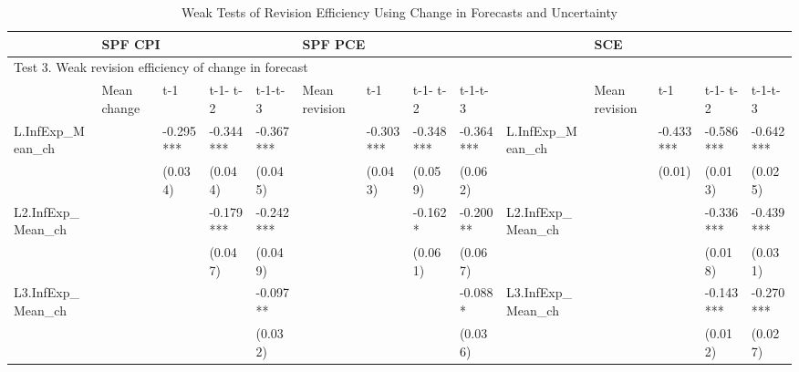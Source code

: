 \documentclass[12pt]{article}
\begin{document}
	
	\begin{table}
		\begin{adjustbox}{width={24cm},totalheight={14cm}}
			\begin{threeparttable}
				\caption{Weak Tests of Revision Efficiency Using Change in Forecasts and Uncertainty}
				\label{WeakRevEfficiency}
				\begin{tabular}{llllllllllllll}
					\hline 
					& \multicolumn{4}{l}{SPF CPI}                     & \multicolumn{4}{l}{SPF PCE}                       &                      & \multicolumn{4}{l}{SCE}                           \\
					\hline 
					\multicolumn{14}{l}{Test 3. Weak revision efficiency of change in forecast}                                                                                                                                    \\
					\hline 
					& Mean change & t-1       & t-1- t-2  & t-1-t-3   & Mean revision & t-1       & t-1- t-2  & t-1-t-3   &                      & Mean revision & t-1       & t-1- t-2  & t-1-t-3   \\
					\hline 
					L.InfExp\_Mean\_ch   &             & -0.295*** & -0.344*** & -0.367*** &               & -0.303*** & -0.348*** & -0.364*** & L.InfExp\_Mean\_ch  &         & -0.433*** & -0.586*** & -0.642*** \\
					&             & (0.034)   & (0.044)   & (0.045)   &               & (0.043)   & (0.059)   & (0.062)   &                    &         & (0.01)     & (0.013)    & (0.025)    \\
					
					L2.InfExp\_Mean\_ch  &             &           & -0.179*** & -0.242*** &               &           & -0.162*   & -0.200**  & L2.InfExp\_Mean\_ch &         &           & -0.336*** & -0.439*** \\
					
					&             &           & (0.047)   & (0.049)   &               &           & (0.061)   & (0.067)   &                                   &         &           & (0.018)    & (0.031)    \\
					L3.InfExp\_Mean\_ch  &             &           &           & -0.097**  &               &           &           & -0.088*   & L3.InfExp\_Mean\_ch &         &           & -0.143*** & -0.270*** \\
					
					&             &           &           & (0.032)   &               &           &           & (0.036)   &                                &         &           & (0.012)    & (0.027)    \\
					

\end{tabular}
\end{threeparttable}
\end{adjustbox}
\end{table}
\end{document}
